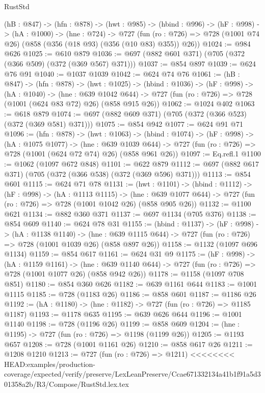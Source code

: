 \begin{lexlean}{RustStd}
\begin{coremodule}
{\begin{coremodule}
  (hB : @847) ->
  (hfn : @878) ->
  (hwt : @985) ->
  (hbind : @996) ->
  (hF : @998) ->
  (hA : @1000) ->
  (hne : @724) ->
  @727 (fun (ro : @726) => @728 (@1001 @74 @26) (@858 (@356 (@18 @93) (@356 (@10 @83) @355)) @26))
@1024 := @984 @626
@1025 := @610 @879
@1036 := @697 (@882 @601 @371) (@705 (@372 (@366 @509) (@372 (@369 @567) @371)))
@1037 := @854 @897
@1039 := @624 @76 @91
@1040 := @1037 @1039
@1042 := @624 @74 @76
@1061 := (hB : @847) ->
  (hfn : @878) ->
  (hwt : @1025) ->
  (hbind : @1036) ->
  (hF : @998) ->
  (hA : @1040) ->
  (hne : @639 @1042 @644) ->
  @727 (fun (ro : @726) => @728 (@1001 (@624 @83 @72) @26) (@858 @915 @26))
@1062 := @1024 @402
@1063 := @618 @879
@1074 := @697 (@882 @609 @371) (@705 (@372 (@366 @523) (@372 (@369 @581) @371)))
@1075 := @854 @942
@1077 := @624 @91 @71
@1096 := (hfn : @878) ->
  (hwt : @1063) ->
  (hbind : @1074) ->
  (hF : @998) ->
  (hA : @1075 @1077) ->
  (hne : @639 @1039 @644) ->
  @727 (fun (ro : @726) => @728 (@1001 (@624 @72 @74) @26) (@858 @961 @26))
@1097 := Eq.refl.{1}
@1100 := @1062 (@1097 @672 @848)
@1101 := @622 @879
@1112 := @697 (@882 @617 @371) (@705 (@372 (@366 @538) (@372 (@369 @596) @371)))
@1113 := @854 @601
@1115 := @624 @71 @78
@1131 := (hwt : @1101) ->
  (hbind : @1112) ->
  (hF : @998) ->
  (hA : @1113 @1115) ->
  (hne : @639 @1077 @644) -> @727 (fun (ro : @726) => @728 (@1001 @1042 @26) (@858 @905 @26))
@1132 := @1100 @621
@1134 := @882 @360 @371
@1137 := @697 @1134 (@705 @376)
@1138 := @854 @609
@1140 := @624 @78 @31
@1155 := (hbind : @1137) ->
  (hF : @998) ->
  (hA : @1138 @1140) ->
  (hne : @639 @1115 @644) -> @727 (fun (ro : @726) => @728 (@1001 @1039 @26) (@858 @897 @26))
@1158 := @1132 (@1097 @696 @1134)
@1159 := @854 @617
@1161 := @624 @31 @9
@1175 := (hF : @998) ->
  (hA : @1159 @1161) ->
  (hne : @639 @1140 @644) -> @727 (fun (ro : @726) => @728 (@1001 @1077 @26) (@858 @942 @26))
@1178 := @1158 (@1097 @708 @851)
@1180 := @854 @360 @626
@1182 := @639 @1161 @644
@1183 := @1001 @1115
@1185 := @728 (@1183 @26)
@1186 := @858 @601
@1187 := @1186 @26
@1192 := (hA : @1180) -> (hne : @1182) -> @727 (fun (ro : @726) => @1185 @1187)
@1193 := @1178 @635
@1195 := @639 @626 @644
@1196 := @1001 @1140
@1198 := @728 (@1196 @26)
@1199 := @858 @609
@1204 := (hne : @1195) -> @727 (fun (ro : @726) => @1198 (@1199 @26))
@1205 := @1193 @657
@1208 := @728 (@1001 @1161 @26)
@1210 := @858 @617 @26
@1211 := @1208 @1210
@1213 := @727 (fun (ro : @726) => @1211)
<<<<<<<< HEAD:examples/production-coverage/expected/verify/preserve/LexLeanPreserve/Ccae671332134a41b1f91a5d301358a2b/R3/Compose/RustStd.lex.tex

\end{coremodule}}
\end{coremodule}
\end{lexlean}
